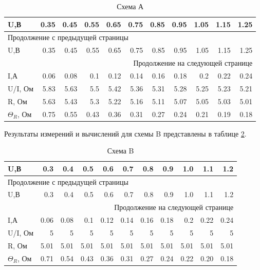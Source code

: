 \documentclass[14pt]{extarticle}
\begin{document}
\begin{longtable}{|l|r|r|r|r|r|r|r|r|r|r|}
\caption{\label{tab:org9f22654}Схема А}
\\[0pt]
\hline
U,В & 0.35 & 0.45 & 0.55 & 0.65 & 0.75 & 0.85 & 0.95 & 1.05 & 1.15 & 1.25\\[0pt]
\hline
\endfirsthead
\multicolumn{11}{l}{Продолжение с предыдущей страницы} \\[0pt]
\hline

U,В & 0.35 & 0.45 & 0.55 & 0.65 & 0.75 & 0.85 & 0.95 & 1.05 & 1.15 & 1.25 \\[0pt]

\hline
\endhead
\hline\multicolumn{11}{r}{Продолжение на следующей странице} \\
\endfoot
\endlastfoot
\hline
I,А & 0.06 & 0.08 & 0.1 & 0.12 & 0.14 & 0.16 & 0.18 & 0.2 & 0.22 & 0.24\\[0pt]
\hline
U/I, Ом & 5.83 & 5.63 & 5.5 & 5.42 & 5.36 & 5.31 & 5.28 & 5.25 & 5.23 & 5.21\\[0pt]
\hline
R, Ом & 5.63 & 5.43 & 5.3 & 5.22 & 5.16 & 5.11 & 5.07 & 5.05 & 5.03 & 5.01\\[0pt]
\hline
\(\Theta_R\), Ом & 0.75 & 0.55 & 0.43 & 0.36 & 0.31 & 0.27 & 0.24 & 0.21 & 0.19 & 0.18\\[0pt]
\hline
\end{longtable}

Результаты измерений и вычислений для схемы B представлены в таблице \ref{tab:org7a4a391}.


\begin{longtable}{|l|r|r|r|r|r|r|r|r|r|r|}
\caption{\label{tab:org7a4a391}Схема B}
\\[0pt]
\hline
U,В & 0.3 & 0.4 & 0.5 & 0.6 & 0.7 & 0.8 & 0.9 & 1.0 & 1.1 & 1.2\\[0pt]
\hline
\endfirsthead
\multicolumn{11}{l}{Продолжение с предыдущей страницы} \\[0pt]
\hline

U,В & 0.3 & 0.4 & 0.5 & 0.6 & 0.7 & 0.8 & 0.9 & 1.0 & 1.1 & 1.2 \\[0pt]

\hline
\endhead
\hline\multicolumn{11}{r}{Продолжение на следующей странице} \\
\endfoot
\endlastfoot
\hline
I,А & 0.06 & 0.08 & 0.1 & 0.12 & 0.14 & 0.16 & 0.18 & 0.2 & 0.22 & 0.24\\[0pt]
\hline
U/I, Ом & 5 & 5 & 5 & 5 & 5 & 5 & 5 & 5 & 5 & 5\\[0pt]
\hline
R, Ом & 5.01 & 5.01 & 5.01 & 5.01 & 5.01 & 5.01 & 5.01 & 5.01 & 5.01 & 5.01\\[0pt]
\hline
\(\Theta_R\), Ом & 0.71 & 0.54 & 0.43 & 0.36 & 0.31 & 0.27 & 0.24 & 0.22 & 0.20 & 0.18\\[0pt]
\hline
\end{longtable}
\end{document}
